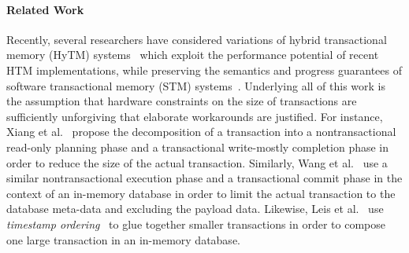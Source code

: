 \paragraph{Related Work}
Recently, several researchers have considered variations 
of hybrid transactional memory (HyTM) 
systems~\cite{DamronFeLe06,DalessandroSpSc10,MatveevSh15}
which exploit the performance potential of recent HTM
implementations, while preserving the semantics and
progress guarantees of software transactional memory (STM)
systems~\cite{ShavitTo95}.  Underlying
all of this work is the assumption that hardware constraints
on the size of transactions are sufficiently unforgiving
that elaborate workarounds are justified.  For instance, Xiang et 
al.~\cite{XiangSc15,XiangSc13} propose the decomposition of
a transaction into a nontransactional read-only 
planning phase and a transactional write-mostly 
completion phase in order to reduce the size of the
actual transaction.  Similarly, Wang et al.~\cite{WangQiLi14} 
use a similar nontransactional execution phase
and a transactional commit phase in the context
of an in-memory database in order to limit the
actual transaction to the database meta-data and 
excluding the payload data.
Likewise, Leis et al.~\cite{LeisKeNe14}
use \emph{timestamp ordering}~\cite{Carey83} to glue together
smaller transactions in order to compose one large
transaction in an in-memory database.  








